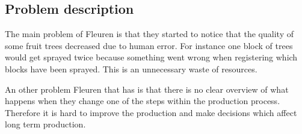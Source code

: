\subsection{Problem description}
The main problem of Fleuren is that they started to notice that the quality of some fruit trees decreased due to human error. For instance  one block of trees would get sprayed twice because something went wrong when registering which blocks have been sprayed. This is an unnecessary waste of resources.

An other problem Fleuren that has is that there is no clear overview of what happens when they change one of the steps within the production process. Therefore it is hard to improve the production and make decisions which affect long term production.
